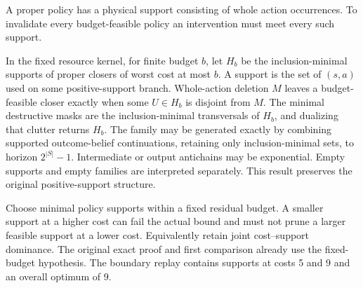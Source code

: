 A proper policy has a physical support consisting of whole action occurrences. To invalidate every budget-feasible policy an intervention must meet every such support.

\begin{theorem}\label{thm:t12}

In the fixed resource kernel, for finite budget \(b\), let \(H_b\) be the inclusion-minimal supports of proper closers of worst cost at most \(b\). A support is the set of \((s,a)\) used on some positive-support branch. Whole-action deletion \(M\) leaves a budget-feasible closer exactly when some \(U\in H_b\) is disjoint from \(M\). The minimal destructive masks are the inclusion-minimal transversals of \(H_b\), and dualizing that clutter returns \(H_b\). The family may be generated exactly by combining supported outcome-belief continuations, retaining only inclusion-minimal sets, to horizon \(2^{|S|}-1\). Intermediate or output antichains may be exponential. Empty supports and empty families are interpreted separately. This result preserves the original positive-support structure.

Choose minimal policy supports within a fixed residual budget. A smaller support at a higher cost can fail the actual bound and must not prune a larger feasible support at a lower cost. Equivalently retain joint cost--support dominance. The original exact proof and first comparison already use the fixed-budget hypothesis. The boundary replay contains supports at costs 5 and 9 and an overall optimum of 9.

\end{theorem}

